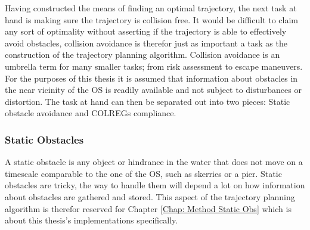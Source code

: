 Having constructed the means of finding an optimal trajectory, the next task at hand is making sure the trajectory is collision free.
It would be difficult to claim any sort of optimality without asserting if the trajectory is able to effectively avoid obstacles, collision avoidance is
therefor just as important a task as the construction of the trajectory planning algorithm. Collision avoidance is an umbrella term for many 
smaller tasks; from risk assessment to escape maneuvers. For the purposes of this thesis it is assumed that information 
about obstacles in the near vicinity of the \gls{OS} is readily available and not subject to disturbances or distortion.
The task at hand can then be separated out into two pieces: Static obstacle avoidance and \gls{COLREGs} compliance. 


\subsubsection*{Static Obstacles} \label{CHAP: static_obs}
A static obstacle is any object or hindrance in the water that does not move on a timescale comparable to the one of the \gls{OS}, such as skerries or a pier. 
Static obstacles are tricky, the way to handle them will depend a lot on how information about obstacles are
gathered and stored. This aspect of the trajectory planning algorithm is therefor reserved for Chapter \ref{Chap: Method Static Obs}
which is about this thesis's implementations specifically.



